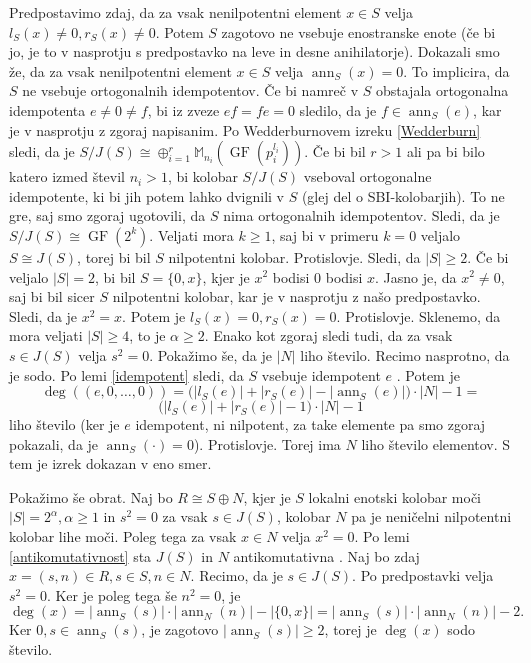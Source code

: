 \documentclass[a4paper, 12pt]{amsart}
\theoremstyle{definition} %
\theoremstyle{plain} %
\newcommand{\M}{\mathbb M}
\DeclareMathOperator{\ann}{ann}
\DeclareMathOperator{\GF}{GF}
\begin{document}
Predpostavimo zdaj, da za vsak nenilpotentni element $x \in S$ velja $l_S(x) \neq 0, r_S(x) \neq 0$. Potem $S$ zagotovo ne vsebuje enostranske enote (če bi jo, je to v nasprotju s predpostavko na leve in desne anihilatorje). Dokazali smo že, da za vsak nenilpotentni element $x\in S$ velja $\ann_S(x) = 0$. To implicira, da $S$ ne vsebuje ortogonalnih idempotentov. Če bi namreč v $S$ obstajala ortogonalna idempotenta $e\neq 0 \neq f$,  bi iz zveze $ef = fe =0$ sledilo, da je $f\in \ann_S(e)$, kar je v nasprotju z zgoraj napisanim. Po Wedderburnovem izreku \ref{Wedderburn} sledi, da je $S/J(S) \cong \oplus_{i=1}^r \M_{n_i}(\GF(p_i^{l_i}))$. Če bi bil $r>1$ ali pa bi bilo katero izmed števil $n_i >1$, bi kolobar $S/J(S)$ vseboval ortogonalne idempotente, ki bi jih potem lahko dvignili v $S$ (glej del o SBI-kolobarjih). To ne gre, saj smo zgoraj ugotovili, da $S$ nima ortogonalnih idempotentov. Sledi, da je $S/J(S) \cong \GF(2^k)$. Veljati mora $k\ge 1$, saj bi v primeru $k=0$ veljalo $S \cong J(S)$, torej bi bil $S$ nilpotentni kolobar. Protislovje. Sledi, da $|S| \ge 2$. Če bi veljalo $|S| = 2$, bi bil $S=\{0,x\}$, kjer je $x^2$ bodisi $0$ bodisi $x$. Jasno je, da $x^2 \neq 0$, saj bi bil sicer $S$ nilpotentni kolobar, kar je v nasprotju z našo predpostavko. Sledi, da je $x^2 = x$. Potem  je $l_S(x) = 0, r_S(x) = 0$. Protislovje. Sklenemo, da mora veljati $|S| \ge 4$, to je $\alpha \ge 2$. Enako kot zgoraj sledi tudi, da za vsak $ s \in J(S)$ velja $s^2 = 0$. Pokažimo še, da je $|N| $ liho število. Recimo nasprotno, da je sodo. Po lemi \ref{idempotent} sledi, da $S$ vsebuje idempotent $e$ . Potem je 
$$
\deg((e,0,\dots,0)) = \big(|l_S(e)| + |r_S(e)| - |\ann_S(e)| \big)\cdot |N| -1 =
$$
$$
 \big(|l_S(e)| + |r_S(e)| - 1 \big)\cdot |N| -1
$$
liho število (ker je $e$ idempotent, ni nilpotent, za take elemente pa smo zgoraj pokazali, da je $\ann_S(\cdot) = 0$). Protislovje. Torej ima $N$ liho število elementov. S tem je izrek dokazan v eno smer.

Pokažimo še obrat. Naj bo $R\cong S\oplus N$, kjer je $S$ lokalni enotski kolobar moči $|S| = 2^{\alpha}, \alpha \ge 1$ in $s^2 = 0 $ za vsak $s\in J(S)$, kolobar $N$ pa je neničelni nilpotentni kolobar lihe moči. Poleg tega za vsak $x\in N$ velja $x^2 = 0$. Po lemi \ref{antikomutativnost} sta $J(S)$ in $N$ antikomutativna . Naj bo zdaj $x= (s,n) \in R, s\in S, n\in N$. Recimo, da je $s\in J(S)$. Po predpostavki velja $s^2 = 0$. Ker je poleg tega še $n^2 = 0$, je 
$$
\deg(x) = |\ann_S(s)|\cdot|\ann_N(n)| - |\{0,x\}| =   |\ann_S(s)|\cdot|\ann_N(n)| - 2.
$$
Ker $0,s\in \ann_S(s)$, je zagotovo $|\ann_S(s)|\ge 2$, torej je $\deg(x)$ sodo število.
\end{document}
